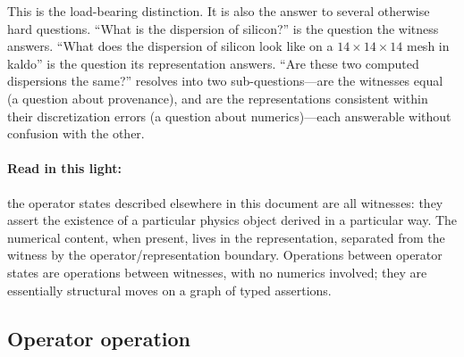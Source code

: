 \documentclass[11pt,a4paper]{article}
\begin{document}
This is the load-bearing distinction. It is also the answer to several otherwise hard questions.
``What is the dispersion of silicon?'' is the question the witness answers. ``What does the
dispersion of silicon look like on a $14\times14\times14$ mesh in kaldo'' is the question its
representation answers. ``Are these two computed dispersions the same?'' resolves into two
sub-questions---are the witnesses equal (a question about provenance), and are the
representations consistent within their discretization errors (a question about numerics)---each
answerable without confusion with the other.

\paragraph{Read in this light:}
the operator states described elsewhere in this document are all witnesses: they assert the
existence of a particular physics object derived in a particular way. The numerical content,
when present, lives in the representation, separated from the witness by the operator/representation
boundary. Operations between operator states are operations between witnesses, with no numerics
involved; they are essentially structural moves on a graph of typed assertions.


\subsection{Operator operation}
\end{document}
